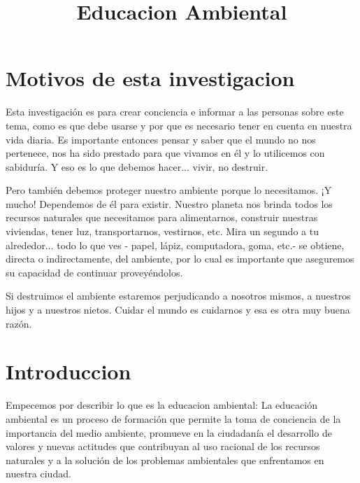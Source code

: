 \documentclass{bmcart}
\begin{document}
	
	\begin{frontmatter}
		
		
		\title{Educacion Ambiental}
		
		\author[
		]{ }
		
	\end{frontmatter}
	
	\section*{Motivos de esta investigacion}
	Esta investigación es para crear conciencia e informar a las personas sobre este tema, como es que debe usarse y por que es necesario tener en cuenta en nuestra vida diaria.
	Es importante entonces pensar y saber que el mundo no nos pertenece, nos ha sido prestado para que vivamos en él y lo utilicemos con sabiduría. Y eso es lo que debemos hacer... vivir, no destruir.
	
	Pero también debemos proteger nuestro ambiente porque lo necesitamos. ¡Y mucho! Dependemos de él para existir. Nuestro planeta nos brinda todos los recursos naturales que necesitamos para alimentarnos, construir nuestras viviendas, tener luz, transportarnos, vestirnos, etc. Mira un segundo a tu alrededor... todo lo que ves - papel, lápiz, computadora, goma, etc.- se obtiene, directa o indirectamente, del ambiente, por lo cual es importante que aseguremos su capacidad de continuar proveyéndolos.
	
	Si destruimos el ambiente estaremos perjudicando a nosotros mismos, a nuestros hijos y a nuestros nietos. Cuidar el mundo es cuidarnos y esa es otra muy buena razón.
	
	\section*{Introduccion}
	Empecemos por describir lo que es la educacion ambiental:
	La educación ambiental es un proceso de formación  que permite la toma de conciencia de la importancia del medio ambiente, promueve en la ciudadanía el desarrollo de valores y nuevas actitudes que contribuyan al uso racional de los recursos naturales y a la solución de los problemas ambientales que enfrentamos en nuestra ciudad.
	
\end{document}
